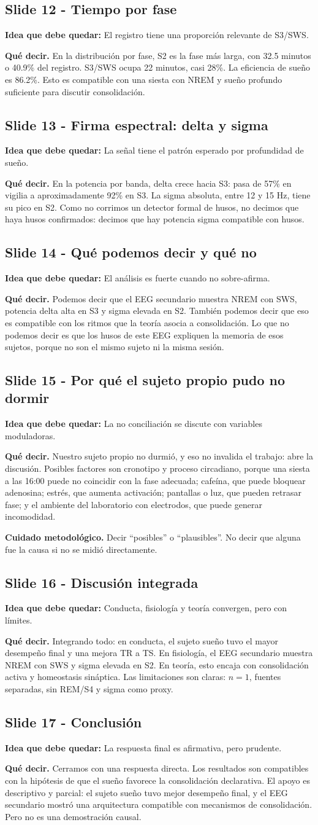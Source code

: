 \documentclass[11pt,a4paper]{article}
\newcommand{\slidehead}[3]{%
\subsection*{Slide #1 - #2}\textbf{Idea que debe quedar:} #3\par}
\newcommand{\decir}{\textbf{Qué decir.} }
\newcommand{\cuidado}{\textbf{Cuidado metodológico.} }
\begin{document}
\slidehead{12}{Tiempo por fase}{El registro tiene una proporción relevante de S3/SWS.}
\decir En la distribución por fase, S2 es la fase más larga, con 32.5 minutos o 40.9\% del registro. S3/SWS ocupa 22 minutos, casi 28\%. La eficiencia de sueño es 86.2\%. Esto es compatible con una siesta con NREM y sueño profundo suficiente para discutir consolidación.

\slidehead{13}{Firma espectral: delta y sigma}{La señal tiene el patrón esperado por profundidad de sueño.}
\decir En la potencia por banda, delta crece hacia S3: pasa de 57\% en vigilia a aproximadamente 92\% en S3. La sigma absoluta, entre 12 y 15 Hz, tiene su pico en S2. Como no corrimos un detector formal de husos, no decimos que haya husos confirmados: decimos que hay potencia sigma compatible con husos.

\slidehead{14}{Qué podemos decir y qué no}{El análisis es fuerte cuando no sobre-afirma.}
\decir Podemos decir que el EEG secundario muestra NREM con SWS, potencia delta alta en S3 y sigma elevada en S2. También podemos decir que eso es compatible con los ritmos que la teoría asocia a consolidación. Lo que no podemos decir es que los husos de este EEG expliquen la memoria de esos sujetos, porque no son el mismo sujeto ni la misma sesión.

\slidehead{15}{Por qué el sujeto propio pudo no dormir}{La no conciliación se discute con variables moduladoras.}
\decir Nuestro sujeto propio no durmió, y eso no invalida el trabajo: abre la discusión. Posibles factores son cronotipo y proceso circadiano, porque una siesta a las 16:00 puede no coincidir con la fase adecuada; cafeína, que puede bloquear adenosina; estrés, que aumenta activación; pantallas o luz, que pueden retrasar fase; y el ambiente del laboratorio con electrodos, que puede generar incomodidad.

\cuidado Decir ``posibles'' o ``plausibles''. No decir que alguna fue la causa si no se midió directamente.

\slidehead{16}{Discusión integrada}{Conducta, fisiología y teoría convergen, pero con límites.}
\decir Integrando todo: en conducta, el sujeto sueño tuvo el mayor desempeño final y una mejora TR a TS. En fisiología, el EEG secundario muestra NREM con SWS y sigma elevada en S2. En teoría, esto encaja con consolidación activa y homeostasis sináptica. Las limitaciones son claras: $n=1$, fuentes separadas, sin REM/S4 y sigma como proxy.

\slidehead{17}{Conclusión}{La respuesta final es afirmativa, pero prudente.}
\decir Cerramos con una respuesta directa. Los resultados son compatibles con la hipótesis de que el sueño favorece la consolidación declarativa. El apoyo es descriptivo y parcial: el sujeto sueño tuvo mejor desempeño final, y el EEG secundario mostró una arquitectura compatible con mecanismos de consolidación. Pero no es una demostración causal.
\end{document}
